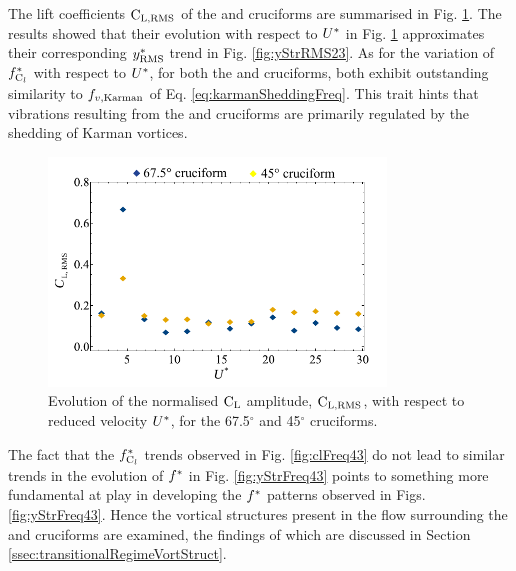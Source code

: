 \documentclass[oneside]{utmthesis}
\begin{document}
The \rms{} lift coefficients $\text{C}_{\text{L,RMS}}$ of the \angfo{} and \angth{} cruciforms are summarised in Fig. \ref{fig:clRMS43}. The results showed that their evolution with respect to $U^{*}$ in Fig. \ref{fig:clRMS43} approximates their corresponding $y^{*}_{\text{RMS}}$ trend in Fig. \ref{fig:yStrRMS23}. As for the variation of $f_{\text{C}_{l}}^{*}$ with respect to $U^{*}$, for both the \angfo{} and \angth{} cruciforms, both exhibit outstanding similarity to $f_{v,\text{Karman}}$ of Eq. \ref{eq:karmanSheddingFreq}. This trait hints that vibrations resulting from the \angfo{} and \angth{} cruciforms are primarily regulated by the shedding of Karman vortices.

\begin{figure}[H]
  \centering
  \includegraphics[width=0.8\textwidth]{figs/clRMS43}
  \caption{Evolution of the normalised $\text{C}_{\text{L}}$ \rms{} amplitude, $\text{C}_{\text{L,RMS}}$, with respect to reduced velocity $U^{*}$, for the 67.5$^{\circ}$ and 45$^{\circ}$ cruciforms.}
  \label{fig:clRMS43}
\end{figure}

The fact that the $f_{\text{C}_{l}}^{*}$ trends observed in Fig. \ref{fig:clFreq43} do not lead to similar trends in the evolution of $f^{*}$ in Fig. \ref{fig:yStrFreq43} points to something more fundamental at play in developing the $f^{*}$ patterns observed in Figs. \ref{fig:yStrFreq43}. Hence the vortical structures present in the flow surrounding the \angfo{} and \angth{} cruciforms are examined, the findings of which are discussed in Section \ref{ssec:transitionalRegimeVortStruct}.
\end{document}
